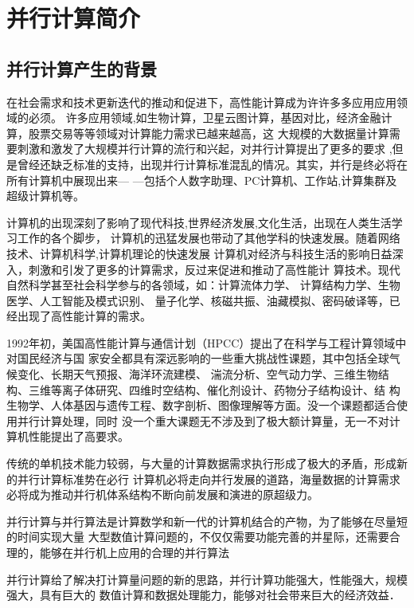 
\chapter[并行计算简介]{并行计算简介}
\section{并行计算产生的背景}

在社会需求和技术更新迭代的推动和促进下，高性能计算成为许许多多应用应用领域的必须。
许多应用领域,如生物计算，卫星云图计算，基因对比，经济金融计算，股票交易等等领域对计算能力需求已越来越高，这
大规模的大数据量计算需要刺激和激发了大规模并行计算的流行和兴起，对并行计算提出了更多的要求
,但是曾经还缺乏标准的支持，出现并行计算标准混乱的情况。其实，并行是终必将在所有计算机中展现出来—
—包括个人数字助理、PC计算机、工作站,计算集群及超级计算机等。

计算机的出现深刻了影响了现代科技,世界经济发展,文化生活，出现在人类生活学习工作的各个脚步，
计算机的迅猛发展也带动了其他学科的快速发展。随着网络技术、计算机科学,计算机理论的快速发展
计算机对经济与科技生活的影响日益深入，刺激和引发了更多的计算需求，反过来促进和推动了高性能计
算技术。现代自然科学甚至社会科学参与的各领域，如：计算流体力学、 计算结构力学、生物医学、人工智能及模式识别、
量子化学、核磁共振、油藏模拟、密码破译等，已经出现了高性能计算的需求。

1992年初，美国高性能计算与通信计划（HPCC）提出了在科学与工程计算领域中对国民经济与国
家安全都具有深远影响的一些重大挑战性课题，其中包括全球气候变化、长期天气预报、海洋环流建模、
湍流分析、空气动力学、三维生物结构、三维等离子体研究、四维时空结构、催化剂设计、药物分子结构设计、结
构生物学、人体基因与遗传工程、数字剖析、图像理解等方面。没一个课题都适合使用并行计算处理，同时
没一个重大课题无不涉及到了极大额计算量，无一不对计算机性能提出了高要求。

传统的单机技术能力较弱，与大量的计算数据需求执行形成了极大的矛盾，形成新的并行计算标准势在必行
计算机必将走向并行发展的道路，海量数据的计算需求必将成为推动并行机体系结构不断向前发展和演进的原超级力。

并行计算与并行算法是计算数学和新一代的计算机结合的产物，为了能够在尽量短的时间实现大量
大型数值计算问题的，不仅仅需要功能完善的并星际，还需要合理的，能够在并行机上应用的合理的并行算法

并行计算给了解决打计算量问题的新的思路，并行计算功能强大，性能强大，规模强大，具有巨大的
数值计算和数据处理能力，能够对社会带来巨大的经济效益．

